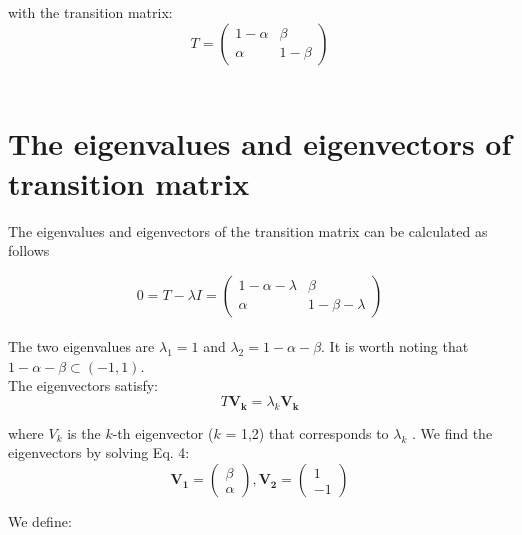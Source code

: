 \documentclass{article}
\begin{document}
with the transition matrix: \\

\begin{equation}
    T=\begin{pmatrix}  
    {1-\alpha} & \beta \\  \alpha & {1-\beta}
    \end{pmatrix}
\end{equation} \\

\section{The eigenvalues and eigenvectors of transition matrix}
The eigenvalues and eigenvectors of the transition matrix can be calculated as follows

\begin{equation}
    0=T-{\lambda}I=\begin{pmatrix} 1 - \alpha - \lambda & \beta \\ \alpha & 1 - \beta - \lambda \end{pmatrix}
\end{equation} \\

The two eigenvalues are ${\lambda}_1=1$ and ${\lambda}_2=1-\alpha-\beta$. It is worth noting that 
$1-\alpha-\beta \subset(-1,1)$. \\

The eigenvectors satisfy: \\

\begin{equation}
    T\boldsymbol{V_k}={\lambda}_k\boldsymbol{V_k}
\end{equation}

where $V_k$ is the $k$-th eigenvector ($k$ = 1,2) that corresponds to ${\lambda}_k$ . We find the eigenvectors by
solving Eq. 4: \\

\begin{equation}
    \boldsymbol{V_1}=\begin{pmatrix}
        \beta \\ \alpha
    \end{pmatrix},
    \boldsymbol{V_2}=\begin{pmatrix}
        1 \\ -1
    \end{pmatrix}
\end{equation}

We define: \\
\end{document}
